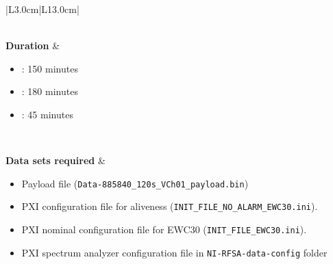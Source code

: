 \begin{table}[H]
\begin{tabular}{|L{3.0cm}|L{13.0cm}|}
\begin{minipage}[t]{\linewidth}
\begin{itemize}[nosep,after=\strut]
		\end{itemize}
	\end{minipage}	
		\\ 
		\hline
		\textbf{Duration} & \begin{minipage}[t]{\linewidth}
	\begin{itemize}[nosep,after=\strut]
		\item {}: 150 minutes
		\item {}: 180 minutes 		
		\item {}: 45 minutes 
		\end{itemize}
	\end{minipage}
	\\ \hline
	
	\textbf{Data sets required} &  \begin{minipage}[t]{\linewidth}
		\begin{itemize}[nosep,after=\strut]
			\item Payload file (\texttt{Data-885840\_120s\_VCh01\_payload.bin})
			\item \comEgse\xspace PXI configuration file for aliveness (\texttt{INIT\_FILE\_NO\_ALARM\_EWC30.ini}).
			\item \comEgse\xspace PXI nominal configuration file for EWC30 (\texttt{INIT\_FILE\_EWC30.ini}).
			\item PXI spectrum analyzer configuration file in \texttt{NI-RFSA-data-config} folder
				\end{itemize}
			\end{minipage}\\
		\hline
		

\end{tabular}
\end{table}
